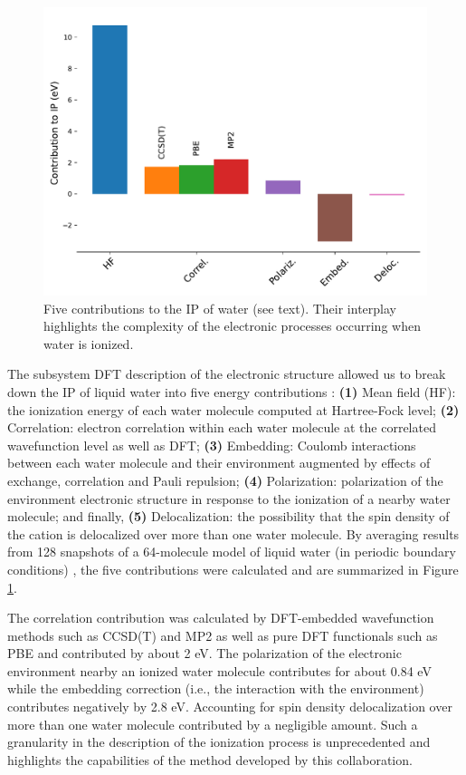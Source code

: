 \documentclass[notitlepage,12pt]{report}
\begin{document}
\begin{figure}
	\includegraphics[width=\linewidth]{./images/contribution_liquidwater_PI}
    \caption{\label{cont_ip}Five contributions to the IP of water (see text). Their interplay highlights the complexity of the electronic processes occurring when water is ionized. \supercite{martinez2022ionization}}
\end{figure}

    The subsystem DFT description of the electronic structure allowed us to break down the IP of liquid water  into five energy contributions \supercite{martinez2022ionization}:  {\bf (1)} Mean field (HF): the ionization energy of each water molecule computed at Hartree-Fock level; {\bf (2)} Correlation: electron correlation within each water molecule at the correlated wavefunction level as well as DFT; {\bf (3)} Embedding: Coulomb interactions between each water molecule and their environment augmented by effects of exchange, correlation and Pauli repulsion; {\bf (4)} Polarization: polarization of the environment electronic structure in response to the ionization of a nearby water molecule; and finally, {\bf (5)} Delocalization: the possibility that the spin density of the cation is delocalized over more than one water molecule. By averaging results from  128  snapshots of a 64-molecule model of liquid water (in periodic boundary conditions) \supercite{gaiduk2018electron}, the five contributions were calculated and are summarized in Figure \ref{cont_ip}. 

    The correlation contribution was calculated by DFT-embedded wavefunction methods such as CCSD(T) and MP2 as well as pure DFT functionals such as PBE and contributed by about 2 eV. The polarization of the electronic environment nearby an ionized water molecule contributes for about 0.84 eV while the embedding correction (i.e., the interaction with the environment) contributes negatively by 2.8 eV. Accounting for spin density delocalization over more than one water molecule contributed by a negligible amount. Such a granularity in the description of the ionization process is unprecedented and highlights the capabilities of the method developed by this collaboration. 	
	
\end{document}
